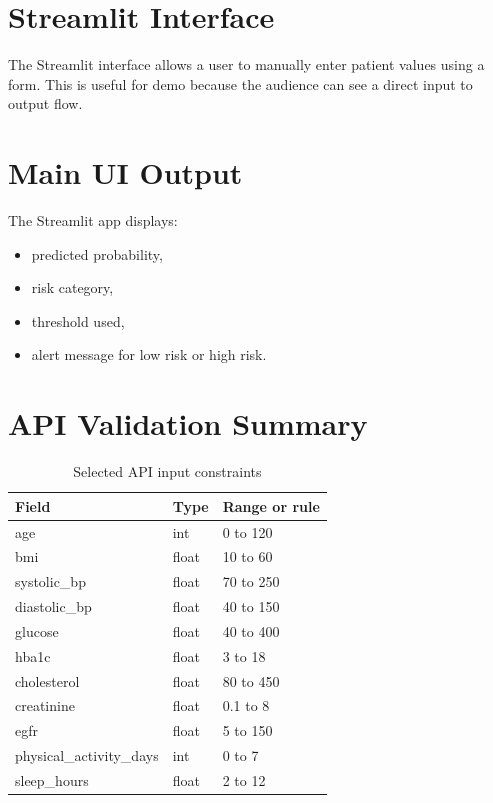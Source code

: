 \documentclass[12pt,a4paper,openany]{report}
\begin{document}
    \section{Streamlit Interface}
    The Streamlit interface allows a user to manually enter patient values using a form. This is useful for demo because the audience can see a direct input to output flow.

    \section{Main UI Output}
    The Streamlit app displays:
    \begin{itemize}[leftmargin=1.4cm]
    \item predicted probability,
    \item risk category,
    \item threshold used,
    \item alert message for low risk or high risk.
    \end{itemize}

    \section{API Validation Summary}
    \begin{table}[H]
    \centering
    \caption{Selected API input constraints}
    \begin{tabularx}{\textwidth}{>{\raggedright\arraybackslash}p{4cm} >{\raggedright\arraybackslash}p{2cm} X}
    \toprule
    \textbf{Field} & \textbf{Type} & \textbf{Range or rule} \\
    \midrule
    age & int & 0 to 120 \\
    bmi & float & 10 to 60 \\
    systolic\_bp & float & 70 to 250 \\
    diastolic\_bp & float & 40 to 150 \\
    glucose & float & 40 to 400 \\
    hba1c & float & 3 to 18 \\
    cholesterol & float & 80 to 450 \\
    creatinine & float & 0.1 to 8 \\
    egfr & float & 5 to 150 \\
    physical\_activity\_days & int & 0 to 7 \\
    sleep\_hours & float & 2 to 12 \\
    \bottomrule
    \end{tabularx}
    \end{table}
\end{document}
